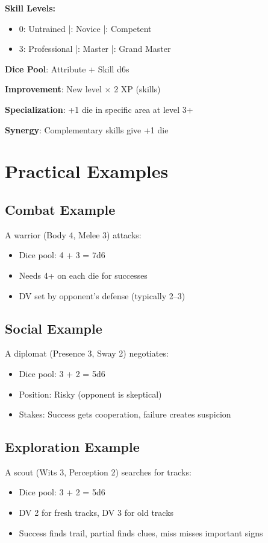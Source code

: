 \begin{multicols}{2}
\begin{tcolorbox}[colback=blue!5!white,colframe=blue!75!black,title=Attributes and Skills Quick Reference,fonttitle=\bfseries]
\textbf{Skill Levels:}
\begin{itemize}
\item 0: Untrained \;|: Novice \;|: Competent
\item 3: Professional \;|: Master \;|: Grand Master
\end{itemize}

\textbf{Dice Pool}: Attribute + Skill d6s

\textbf{Improvement}: New level $\times$ 2 XP (skills)

\textbf{Specialization}: +1 die in specific area at level 3+

\textbf{Synergy}: Complementary skills give +1 die
\end{tcolorbox}

\section{Practical Examples}

\subsection*{Combat Example}
A warrior (Body 4, Melee 3) attacks:
\begin{itemize}
\item Dice pool: 4 + 3 = 7d6
\item Needs 4+ on each die for successes
\item DV set by opponent's defense (typically 2--3)
\end{itemize}

\subsection*{Social Example}
A diplomat (Presence 3, Sway 2) negotiates:
\begin{itemize}
\item Dice pool: 3 + 2 = 5d6
\item Position: Risky (opponent is skeptical)
\item Stakes: Success gets cooperation, failure creates suspicion
\end{itemize}

\subsection*{Exploration Example}
A scout (Wits 3, Perception 2) searches for tracks:
\begin{itemize}
\item Dice pool: 3 + 2 = 5d6
\item DV 2 for fresh tracks, DV 3 for old tracks
\item Success finds trail, partial finds clues, miss misses important signs
\end{itemize}


\end{multicols}
